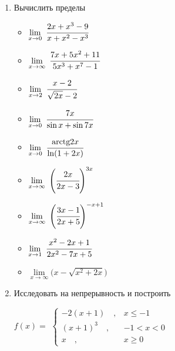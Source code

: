 \documentclass{article}
\begin{document}
\begin{multicols}{2}
	\begin{enumerate}[label=\arabic*.]
		\item Вычислить пределы
		\begin{multicols}{3}
			\begin{itemize}[label=""]
				\item $\lim\limits_{x \to 0}\ \cfrac{2x+x^3-9}{x+x^2-x^3}$
				\item $\lim\limits_{x \to \infty}\ \cfrac{7x+5x^2+11}{5x^3+x^7-1}$
				\item $\lim\limits_{x \to 2}\ \cfrac{x-2}{\sqrt{2x}-2}$
				\vfill\null\columnbreak
				\item $\lim\limits_{x \to 0}\ \cfrac{7x}{\sin x + \sin 7x}$
				\item $\lim\limits_{x \to 0}\ \cfrac{\mbox{arctg}2x}{\ln(1 + 2x)}$
				\item $\lim\limits_{x \to \infty}\ \Bigg(\cfrac{2x}{2x-3}\Bigg)^{3x}$
				\vfill\null\columnbreak
				\item $\lim\limits_{x \to \infty}\ \Bigg(\cfrac{3x-1}{2x+5}\Bigg)^{-x+1}$
				\item $\lim\limits_{x \to 1}\ \cfrac{x^2-2x+1}{2x^2-7x+5}$
				\item $\lim\limits_{x \to \infty} \big( x-\sqrt{x^2+2x} \big)$
				\vfill\null\columnbreak
			\end{itemize}
		\end{multicols}
		\vspace{-5mm}
		\item Исследовать на непрерывность и построить
		\begin{multicols}{3}
			$f(x)=$
			$\begin{cases}
			-2(x+1) \quad, & x \leq -1\\
			(x+1)^3 \quad, & -1 < x < 0 \\
			x \quad, & x \geq 0
			\end{cases}$
			\vfill\null\columnbreak
			\vfill\null\columnbreak
		\end{multicols}
		

\end{enumerate}
\end{multicols}
\end{document}
